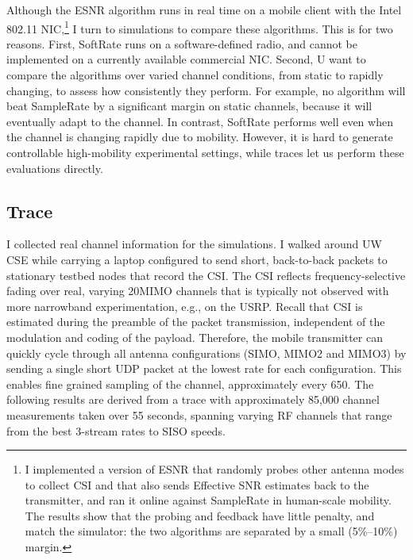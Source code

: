 Although the ESNR algorithm runs in real time on a mobile client with the Intel 802.11 NIC,\footnote{I implemented a version of ESNR that randomly probes other antenna modes to collect CSI and that also sends Effective SNR estimates back to the transmitter, and ran it online against SampleRate in human-scale mobility. The results show that the probing and feedback have little penalty, and match the simulator: the two algorithms are separated by a small (5\%--10\%) margin.} I turn to simulations to compare these algorithms. %
This is for two reasons. First, SoftRate runs on a software-defined radio, and cannot be implemented on a currently available commercial NIC. Second, U want to compare the algorithms over varied channel conditions, from static to rapidly changing, to assess how consistently they perform. 
For example, no algorithm will beat SampleRate by a significant margin on static channels, because it will eventually adapt to the channel. In contrast, SoftRate performs well even when the channel is changing rapidly due to mobility. However, it is hard to generate controllable high-mobility experimental settings, while traces let us perform these evaluations directly.



\subsection{Trace} I collected real channel information for the simulations. I walked around UW CSE while carrying a laptop configured to send short, back-to-back packets to stationary testbed nodes that record the CSI. The CSI reflects frequency-selective fading over real, varying 20\MHz MIMO channels that is typically not observed with more narrowband experimentation, e.g., on the USRP. Recall that CSI is estimated during the preamble of the packet transmission, independent of the modulation and coding of the payload. Therefore, the mobile transmitter can quickly cycle through all antenna configurations (SIMO, MIMO2 and MIMO3) by sending a single short UDP packet at the lowest rate for each configuration. This enables fine grained sampling of the channel, approximately every 650\us. The following results are derived from a trace with approximately 85,000 channel measurements taken over 55 seconds, spanning varying RF channels that range from the best 3-stream rates to SISO speeds.

